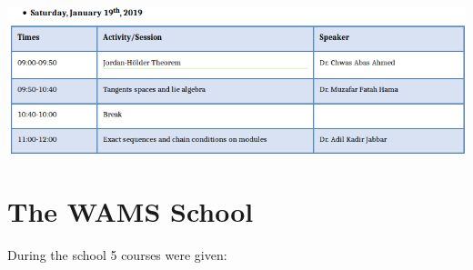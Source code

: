 \documentclass[12pt,a4paper]{scrartcl}
\begin{document}
\centerline{\includegraphics[width=18cm]{prep3.png}}

\section{The WAMS School}

During the school 5 courses were given:
\end{document}
